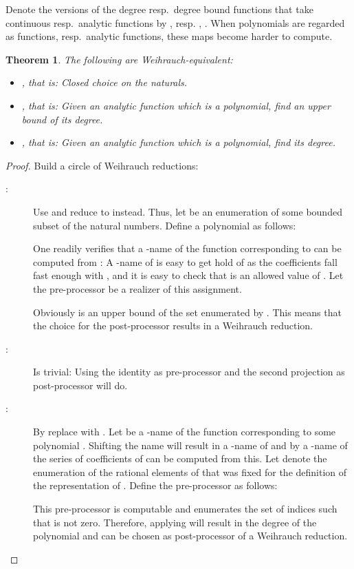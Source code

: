 \documentclass{eptcs-modified}
\newtheorem{theorem}{Theorem}
\begin{document}
			Denote the versions of the degree resp.\ degree bound functions that take continuous resp.\ analytic functions by ,  resp. , .
			When polynomials are regarded as functions, resp.\ analytic functions, these maps become harder to compute.

			\begin{theorem}\label{resu:polynomials as analytic functions}
				The following are Weihrauch-equivalent:
				\begin{itemize}
					\item , that is: Closed choice on the naturals.
					\item , that is: Given an analytic function which is a polynomial, find an upper bound of its degree.
					\item , that is: Given an analytic function which is a polynomial, find its degree.
				\end{itemize}
			\end{theorem}
			\begin{proof}
				Build a circle of Weihrauch reductions:
				\begin{description}
					\item[:] Use  and reduce to  instead.
					Thus, let  be an enumeration of some bounded subset of the natural numbers.
					Define a polynomial  as follows:
					
					One readily verifies that a -name of the function  corresponding to  can be computed from : A -name of  is easy to get hold of as the coefficients fall fast enough with , and it is easy to check that  is an allowed value of .
					Let the pre-processor  be a realizer of this assignment.

					Obviously  is an upper bound of the set enumerated by .
					This means that the choice  for the post-processor results in a Weihrauch reduction.
					\item[:]
					Is trivial: Using the identity as pre-processor and the second projection as post-processor will do.
					\item[:]
					By  replace  with .
					Let  be a -name of the function corresponding to some polynomial .
					Shifting the name will result in a -name of  and by  a -name  of the series of coefficients of  can be computed from this.
					Let  denote the enumeration of the rational elements of  that was fixed for the definition of the representation of .
					Define the pre-processor  as follows:
					
					This pre-processor is computable and  enumerates the set of indices  such that  is not zero.
					Therefore, applying  will result in the degree of the polynomial and  can be chosen as post-processor of a Weihrauch reduction.
				\end{description}
			\end{proof}
\end{document}
